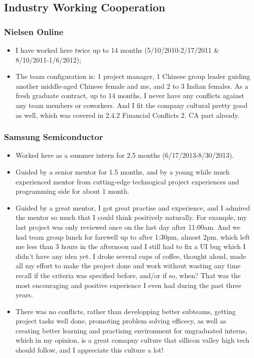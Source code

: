 \documentclass[9pt,b5paper]{article}
\begin{document}
\subsection{Industry Working Cooperation}
\label{sec-3-2}
\subsubsection{Nielsen Online}
\label{sec-3-2-1}
\begin{itemize}
\item I have worked here twice up to 14 months (5/10/2010-2/17/2011 \& 8/10/2011-1/6/2012);
\item The team configuration is: 1 project manager, 1 Chinese group leader guiding another middle-aged Chinese female and me, and 2 to 3 Indian females. As a fresh graduate contract, up to 14 months, I never have any conflicts against any team members or coworkers. And I fit the company cultural pretty good as well, which was covered in 2.4.2 Financial Conflicts 2. CA part already.
\end{itemize}
\subsubsection{Samsung Semiconductor}
\label{sec-3-2-2}
\begin{itemize}
\item Worked here as a summer intern for 2.5 months (6/17/2013-8/30/2013).
\item Guided by a senior mentor for 1.5 months, and by a young while much experienced mentor from cutting-edge technogical project experiences and programming side for about 1 month.
\item Guided by a great mentor, I got great practise and experience, and I admired the mentor so much that I could think positively naturally. For example, my last project was only reviewed once on the last day after 11:00am. And we had team group lunch for farewell up to after 1:30pm, almost 2pm, which left me less than 3 hours in the afternoon and I still had to fix a UI bug which I didn't have any idea yet. I droke several cups of coffee, thought aloud, made all my effort to make the project done and work without wasting any time recall if the criteria was specified before, and/or if so, when? That was the most encouraging and positive experience I even had during the past three years.
\item There was no conflicts, rather than developping better subteams, getting project tasks well done, promoting problem solving efficecy, as well as creating better learning and practising environment for ungraduated interns, which in my opinion, is a great comapny culture that sillicon valley high tech should follow, and I appreciate this culture a lot!
\end{itemize}
\end{document}
